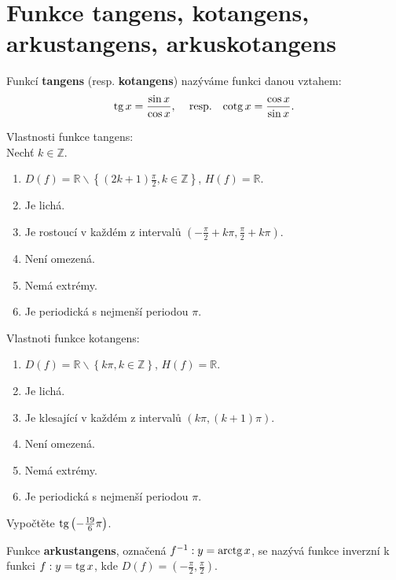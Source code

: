 \section{Funkce tangens, kotangens, arkustangens, arkuskotangens}
\begin{definition}
  Funkcí \textbf{tangens} (resp. \textbf{kotangens}) nazýváme funkci danou vztahem:
  \begin{align*}
    \tg x = \frac{\sin x}{\cos x}, & & \textrm{resp.} & & \cotg x = \frac{\cos x}{\sin x}.
  \end{align*}
\end{definition}

\begin{veta}
    Vlastnosti funkce tangens:\\
    Nechť $k\in \mathbb Z.$
    \begin{enumerate}[$i.$]
        \item $D(f)= \mathbb R\smallsetminus\left \{ (2k+1)\frac{\pi}{2}, k\in \mathbb Z \right \} $, $H(f)= \mathbb R $.
       	\item Je lichá.
        \item Je rostoucí v každém z intervalů $\left ( -\frac{\pi}{2}+k\pi, \frac{\pi}{2}+k\pi \right ) $.
        \item Není omezená.
        \item Nemá extrémy.
        \item Je periodická s nejmenší periodou $\pi.$
    \end{enumerate}
    Vlastnoti funkce kotangens:
    \begin{enumerate}[$i.$]
        \item $D(f)= \mathbb R\smallsetminus\left \{ k\pi, k\in \mathbb Z \right \} $, $H(f)= \mathbb R $.
       	\item Je lichá.
        \item Je klesající v každém z intervalů $\left ( k\pi, (k+1)\pi \right ) $.
        \item Není omezená.
        \item Nemá extrémy.
        \item Je periodická s nejmenší periodou $\pi.$
    \end{enumerate}
\end{veta}

\begin{priklad}
Vypočtěte $\operatorname{tg} \left ( -\frac{19}{6}\pi \right ) $.
\end{priklad}

\begin{definition}
  Funkce \textbf{arkustangens}, označená $f^{-1}: y=\operatorname{arctg} x$, se nazývá funkce inverzní k funkci $f: y=\operatorname{tg} x$, kde $D(f)=\left ( -\frac{\pi}{2}, \frac{\pi}{2} \right )$.
\end{definition}

